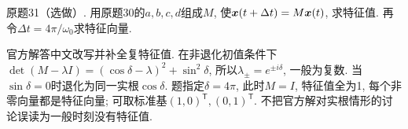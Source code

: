 \begin{exercise}
原题31（选做）. 用原题30的$a,b,c,d$组成$M$, 使$\boldsymbol{x}(t+\Delta t)=M\boldsymbol{x}(t)$, 求特征值. 再令$\Delta t=4\pi/\omega_0$求特征向量.
\end{exercise}
\begin{solution}
官方解答中文改写并补全复特征值. 在非退化初值条件下$\det(M-\lambda I)=(\cos\delta-\lambda)^2+\sin^2\delta$, 所以$\lambda_\pm=e^{\pm i\delta}$, 一般为复数. 当$\sin\delta=0$时退化为同一实根$\cos\delta$. 题指定$\delta=4\pi$, 此时$M=I$, 特征值全为1, 每个非零向量都是特征向量; 可取标准基$(1,0)^{\mathsf T},(0,1)^{\mathsf T}$. 不把官方解对实根情形的讨论误读为一般时刻没有特征值.
\end{solution}

